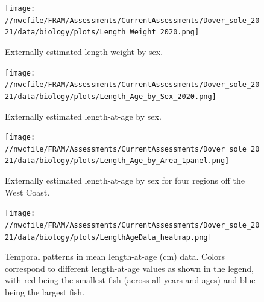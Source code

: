 \documentclass[11pt,
  english,
  a4paper,
]{article}
\begin{document}
\tagmcend\tagstructend


\begin{figure}
\centering
\texttt{[image: //nwcfile/FRAM/Assessments/CurrentAssessments/Dover\_sole\_2021/data/biology/plots/Length\_Weight\_2020.png]}
\caption{Externally estimated length-weight by sex.\label{fig:est-len-wght}}
\end{figure}

\tagmcend\tagstructend


\begin{figure}
\centering
\texttt{[image: //nwcfile/FRAM/Assessments/CurrentAssessments/Dover\_sole\_2021/data/biology/plots/Length\_Age\_by\_Sex\_2020.png]}
\caption{Externally estimated length-at-age by sex.\label{fig:est-len-at-age}}
\end{figure}

\tagmcend\tagstructend


\begin{figure}
\centering
\texttt{[image: //nwcfile/FRAM/Assessments/CurrentAssessments/Dover\_sole\_2021/data/biology/plots/Length\_Age\_by\_Area\_1panel.png]}
\caption{Externally estimated length-at-age by sex for four regions off the West Coast.\label{fig:est-len-at-age-region}}
\end{figure}

\tagmcend\tagstructend


\begin{figure}
\centering
\texttt{[image: //nwcfile/FRAM/Assessments/CurrentAssessments/Dover\_sole\_2021/data/biology/plots/LengthAgeData\_heatmap.png]}
\caption{Temporal patterns in mean length-at-age (cm) data. Colors correspond to different length-at-age values as shown in the legend, with red being the smallest fish (across all years and ages) and blue being the largest fish.\label{fig:tv-len-at-age}}
\end{figure}
\end{document}
